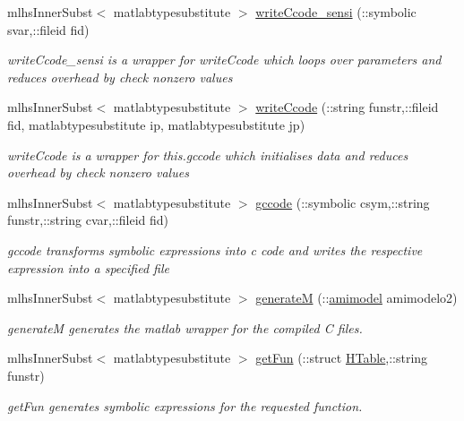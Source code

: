 \begin{DoxyCompactItemize}
\item 
mlhs\+Inner\+Subst$<$ matlabtypesubstitute $>$ \hyperlink{classamimodel_a65b30e6d951ff694d40d45b0625742c7}{write\+Ccode\+\_\+sensi} (\+::symbolic svar,\+::fileid fid)
\begin{DoxyCompactList}\small\item\em write\+Ccode\+\_\+sensi is a wrapper for write\+Ccode which loops over parameters and reduces overhead by check nonzero values \end{DoxyCompactList}\item 
mlhs\+Inner\+Subst$<$ matlabtypesubstitute $>$ \hyperlink{classamimodel_a874862825ea3346f977f518072dec051}{write\+Ccode} (\+::string funstr,\+::fileid fid, matlabtypesubstitute ip, matlabtypesubstitute jp)
\begin{DoxyCompactList}\small\item\em write\+Ccode is a wrapper for this.\+gccode which initialises data and reduces overhead by check nonzero values \end{DoxyCompactList}\item 
mlhs\+Inner\+Subst$<$ matlabtypesubstitute $>$ \hyperlink{classamimodel_aca8ccaf522a4aadb4ce12b7b636570b2}{gccode} (\+::symbolic csym,\+::string funstr,\+::string cvar,\+::fileid fid)
\begin{DoxyCompactList}\small\item\em gccode transforms symbolic expressions into c code and writes the respective expression into a specified file \end{DoxyCompactList}\item 
mlhs\+Inner\+Subst$<$ matlabtypesubstitute $>$ \hyperlink{classamimodel_a1b75344ed773e2c5c1b76b8a97861234}{generate\+M} (\+::\hyperlink{classamimodel}{amimodel} amimodelo2)
\begin{DoxyCompactList}\small\item\em generate\+M generates the matlab wrapper for the compiled C files. \end{DoxyCompactList}\item 
mlhs\+Inner\+Subst$<$ matlabtypesubstitute $>$ \hyperlink{classamimodel_a73f1b1b08350475e8d854d1a7f1944e1}{get\+Fun} (\+::struct \hyperlink{classamimodel_aafe6335df413dd688a2f44efba012cf1}{H\+Table},\+::string funstr)
\begin{DoxyCompactList}\small\item\em get\+Fun generates symbolic expressions for the requested function. \end{DoxyCompactList}\item 

\end{DoxyCompactItemize}
